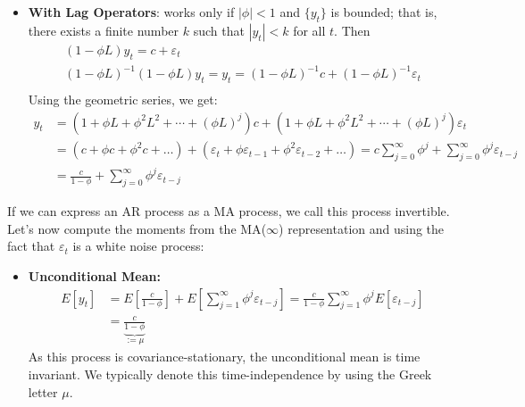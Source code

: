 \begin{enumerate}
\begin{itemize}
\item
\textbf{With Lag Operators}:
works only if \(|\phi| < 1\) and \( \{y_t\} \) is bounded;
that is, there exists a finite number \(k\) such that \(|y_t| < k\) for all \(t\).
Then
\begin{align*}
(1-\phi L) y_t = c + \varepsilon_t
\\
{(1-\phi L)}^{-1}{(1-\phi L)} y_t =	y_t = {(1-\phi L)}^{-1} c + {(1-\phi L)}^{-1}\varepsilon_t
\\
\end{align*}
Using the geometric series, we get:
\begin{align*}
y_t &= (1+\phi L + \phi^2 L^2+\cdots+{(\phi L)}^j) c
  + (1+\phi L + \phi^2 L^2+\cdots+{(\phi L)}^j)\varepsilon_t
\\
&= \left(c + \phi c + \phi^2 c + \ldots \right) + \left(\varepsilon_t + \phi \varepsilon_{t-1} + \phi^2 \varepsilon_{t-2}+\ldots\right)
= c \sum_{j=0}^\infty \phi^j + \sum_{j=0}^\infty \phi^j \varepsilon_{t-j}
\\
&= \frac{c}{1-\phi} + \sum_{j=0}^\infty \phi^j \varepsilon_{t-j}
\end{align*}
\end{itemize}
If we can express an AR process as a MA process, we call this process invertible.
Let's now compute the moments from the MA{(\(\infty \))} representation
  and using the fact that \(\varepsilon_t\) is a white noise process:
\begin{itemize}
\item
\textbf{Unconditional Mean:}
\begin{align*}
E[y_t] &= E\left[\frac{c}{1-\phi}\right] + E\left[\sum_{j=1}^{\infty} \phi^j \varepsilon_{t-j}\right] = \frac{c}{1-\phi} \sum_{j=1}^{\infty} \phi^j E[\varepsilon_{t-j}]
\\
&= \underbrace{\frac{c}{1-\phi}}_{:=\mu}
\end{align*}
As this process is covariance-stationary, the unconditional mean is time invariant.
We typically denote this time-independence by using the Greek letter \(\mu \).


\end{itemize}
\end{enumerate}
